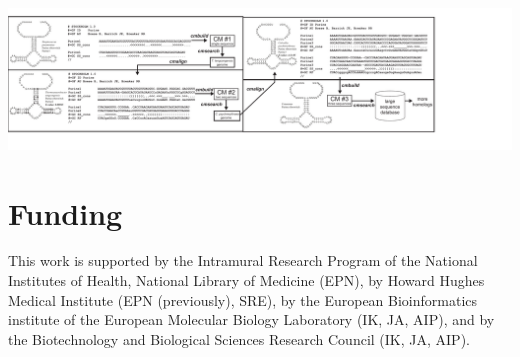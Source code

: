 \documentclass[custom,landscape,final,30pt,plainboxedsections]{sciposter-titleskipsmall}
\begin{document}
\begin{multicols}{3}
\begin{center}
\includegraphics[width=26.125in]{figs/iterative-purine-poster}
\end{center}

\section*{Funding}
\begin{footnotesize}
This work is supported by the Intramural Research Program of the
National Institutes of Health, National Library of Medicine (EPN), 
by Howard Hughes Medical Institute (EPN (previously), SRE), by the European
Bioinformatics institute of the European Molecular Biology Laboratory
(IK, JA, AIP), and by the Biotechnology and Biological Sciences
Research Council (IK, JA, AIP).
\end{footnotesize}


\begin{tiny}

\end{tiny}

\end{multicols}
\end{document}
